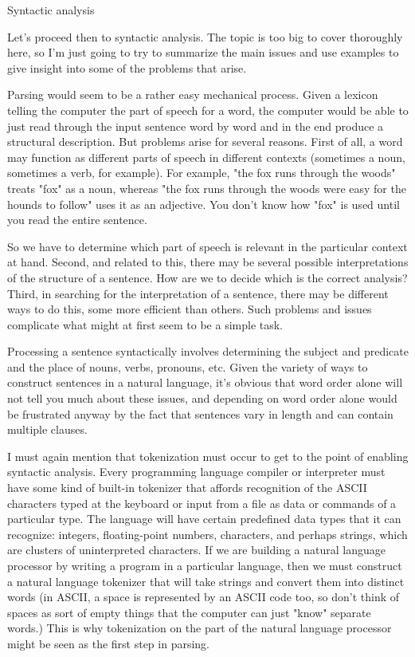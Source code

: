 Syntactic analysis

Let's proceed then to syntactic analysis. The topic is too big to cover thoroughly here, so I'm just going to try to summarize the main issues and use examples to give insight into some of the problems that arise.

Parsing would seem to be a rather easy mechanical process. Given a lexicon telling the computer the part of speech for a word, the computer would be able to just read through the input sentence word by word and in the end produce a structural description. But problems arise for several reasons. First of all, a word may function as different parts of speech in different contexts (sometimes a noun, sometimes a verb, for example). For example, "the fox runs through the woods" treats "fox" as a noun, whereas "the fox runs through the woods were easy for the hounds to follow" uses it as an adjective. You don't know how "fox" is used until you read the entire sentence.

So we have to determine which part of speech is relevant in the particular context at hand. Second, and related to this, there may be several possible interpretations of the structure of a sentence. How are we to decide which is the correct analysis? Third, in searching for the interpretation of a sentence, there may be different ways to do this, some more efficient than others. Such problems and issues complicate what might at first seem to be a simple task.

Processing a sentence syntactically involves determining the subject and predicate and the place of nouns, verbs, pronouns, etc. Given the variety of ways to construct sentences in a natural language, it's obvious that word order alone will not tell you much about these issues, and depending on word order alone would be frustrated anyway by the fact that sentences vary in length and can contain multiple clauses.

I must again mention that tokenization must occur to get to the point of enabling syntactic analysis. Every programming language compiler or interpreter must have some kind of built-in tokenizer that affords recognition of the ASCII characters typed at the keyboard or input from a file as data or commands of a particular type. The language will have certain predefined data types that it can recognize: integers, floating-point numbers, characters, and perhaps strings, which are clusters of uninterpreted characters. If we are building a natural language processor by writing a program in a particular language, then we must construct a natural language tokenizer that will take strings and convert them into distinct words (in ASCII, a space is represented by an ASCII code too, so don't think of spaces as sort of empty things that the computer can just "know" separate words.) This is why tokenization on the part of the natural language processor might be seen as the first step in parsing.

